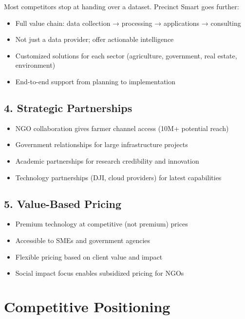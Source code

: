 Most competitors stop at handing over a dataset. Precinct Smart goes further:

\begin{itemize}
    \item Full value chain: data collection → processing → applications → consulting
    \item Not just a data provider; offer actionable intelligence
    \item Customized solutions for each sector (agriculture, government, real estate, environment)
    \item End-to-end support from planning to implementation
\end{itemize}

\subsection{4. Strategic Partnerships}

\begin{itemize}
    \item NGO collaboration gives farmer channel access (10M+ potential reach)
    \item Government relationships for large infrastructure projects
    \item Academic partnerships for research credibility and innovation
    \item Technology partnerships (DJI, cloud providers) for latest capabilities
\end{itemize}

\subsection{5. Value-Based Pricing}

\begin{itemize}
    \item Premium technology at competitive (not premium) prices
    \item Accessible to SMEs and government agencies
    \item Flexible pricing based on client value and impact
    \item Social impact focus enables subsidized pricing for NGOs
\end{itemize}

\section{Competitive Positioning}

